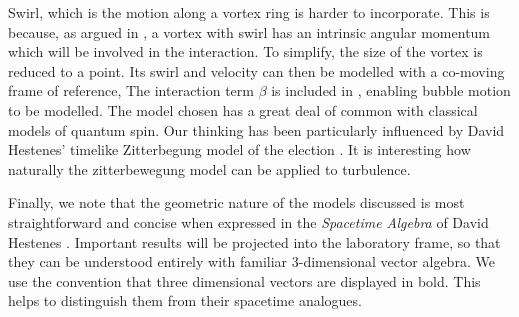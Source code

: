 Swirl, which is  the motion along a vortex ring is harder to incorporate.
This is because, as argued in , a vortex with swirl has an intrinsic angular momentum
which will be involved in the interaction.
To simplify, the size of the vortex is reduced to a point.
Its swirl and velocity can then be modelled with a co-moving frame of reference,
The interaction term $\beta$ is included in ,  enabling bubble motion to be modelled.
The model chosen has a great deal of common with classical models of quantum  spin.
Our thinking has been particularly influenced by David Hestenes' timelike  Zitterbegung model of the election \cite{Hestenes1973, Hestenes1990, HestenesResearchProgram}.  
It is interesting how naturally the zitterbewegung model can be applied to turbulence.

Finally, we note that the geometric nature of the models discussed is most straightforward
and  concise when expressed in the {\em Spacetime Algebra} of David Hestenes \cite{Hestenes2003}.
Important results will be projected into the laboratory frame,
so that they can be understood entirely with familiar 3-dimensional vector algebra.
We use the convention that three dimensional vectors are displayed in bold.
This helps to distinguish them from their spacetime analogues.







 



